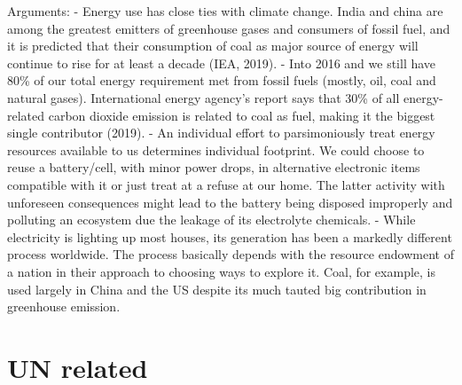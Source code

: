 \documentclass[]{book}
\begin{document}
Arguments:
- Energy use has close ties with climate change. India and china are among the greatest emitters of greenhouse gases and consumers of fossil fuel, and it is predicted that their consumption of coal as major source of energy will continue to rise for at least a decade (IEA, 2019).
- Into 2016 and we still have 80\% of our total energy requirement met from fossil fuels (mostly, oil, coal and natural gases). International energy agency's report says that 30\% of all energy-related carbon dioxide emission is related to coal as fuel, making it the biggest single contributor (2019).
- An individual effort to parsimoniously treat energy resources available to us determines individual footprint. We could choose to reuse a battery/cell, with minor power drops, in alternative electronic items compatible with it or just treat at a refuse at our home. The latter activity with unforeseen consequences might lead to the battery being disposed improperly and polluting an ecosystem due the leakage of its electrolyte chemicals.
- While electricity is lighting up most houses, its generation has been a markedly different process worldwide. The process basically depends with the resource endowment of a nation in their approach to choosing ways to explore it. Coal, for example, is used largely in China and the US despite its much tauted big contribution in greenhouse emission.

\hypertarget{un-related}{%
\section{UN related}\label{un-related}}
\end{document}
